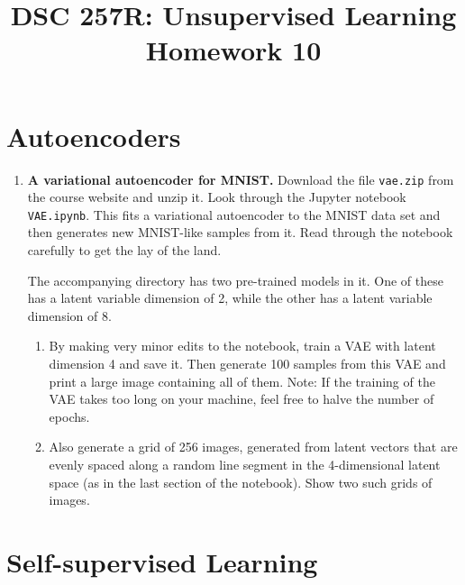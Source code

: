 \documentclass{article}
\title{DSC 257R: Unsupervised Learning \\ Homework 10}
\author{}
\date{}
\begin{document}
\maketitle

\section*{Autoencoders}

\begin{enumerate}
\item \textbf{A variational autoencoder for MNIST.} Download the file \texttt{vae.zip} from the course website and unzip it. Look through the Jupyter notebook \texttt{VAE.ipynb}. This fits a variational autoencoder to the MNIST data set and then generates new MNIST-like samples from it. Read through the notebook carefully to get the lay of the land.

The accompanying directory has two pre-trained models in it. One of these has a latent variable dimension of 2, while the other has a latent variable dimension of 8.

\begin{enumerate}
\item By making very minor edits to the notebook, train a VAE with latent dimension 4 and save it. Then generate 100 samples from this VAE and print a large image containing all of them. Note: If the training of the VAE takes too long on your machine, feel free to halve the number of epochs.

\item Also generate a grid of 256 images, generated from latent vectors that are evenly spaced along a random line segment in the 4-dimensional latent space (as in the last section of the notebook). Show two such grids of images.
\end{enumerate}
\end{enumerate}

\section*{Self-supervised Learning}
\end{document}
